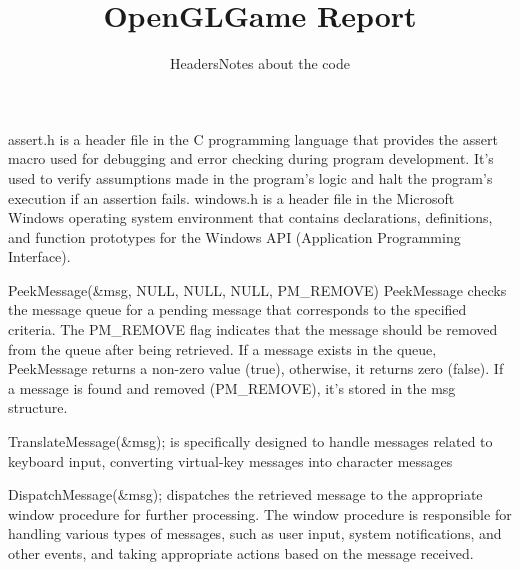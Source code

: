 \documentclass[a4paper, 12pt]{article}
\title{OpenGLGame Report}
\begin{document}
\maketitle
\tableofcontents
\newpage


\subtitle{Headers}
assert.h is a header file in the C programming language that provides the assert macro used for debugging and error checking during program development. It's used to verify assumptions made in the program's logic and halt the program's execution if an assertion fails.
windows.h is a header file in the Microsoft Windows operating system environment that contains declarations, definitions, and function prototypes for the Windows API (Application Programming Interface).

\subtitle{Notes about the code}

PeekMessage(&msg, NULL, NULL, NULL, PM_REMOVE)
PeekMessage checks the message queue for a pending message that corresponds to the specified criteria.
The PM_REMOVE flag indicates that the message should be removed from the queue after being retrieved.
If a message exists in the queue, PeekMessage returns a non-zero value (true), otherwise, it returns zero (false).
If a message is found and removed (PM_REMOVE), it's stored in the msg structure.

TranslateMessage(&msg);
is specifically designed to handle messages related to keyboard input, converting virtual-key messages into character messages

DispatchMessage(&msg);
dispatches the retrieved message to the appropriate window procedure for further processing.
The window procedure is responsible for handling various types of messages, such as user input, system notifications, and other events, and taking appropriate actions based on the message received.
\end{document}
